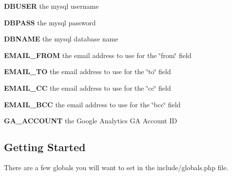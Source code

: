 \begin{DoxyItemize}
\item {\bfseries D\-B\-U\-S\-E\-R} the mysql username
\end{DoxyItemize}


\begin{DoxyItemize}
\item {\bfseries D\-B\-P\-A\-S\-S} the mysql password
\end{DoxyItemize}


\begin{DoxyItemize}
\item {\bfseries D\-B\-N\-A\-M\-E} the mysql database name
\end{DoxyItemize}


\begin{DoxyItemize}
\item {\bfseries E\-M\-A\-I\-L\-\_\-\-F\-R\-O\-M} the email address to use for the \char`\"{}from\char`\"{} field
\end{DoxyItemize}


\begin{DoxyItemize}
\item {\bfseries E\-M\-A\-I\-L\-\_\-\-T\-O} the email address to use for the \char`\"{}to\char`\"{} field
\end{DoxyItemize}


\begin{DoxyItemize}
\item {\bfseries E\-M\-A\-I\-L\-\_\-\-C\-C} the email address to use for the \char`\"{}cc\char`\"{} field
\end{DoxyItemize}


\begin{DoxyItemize}
\item {\bfseries E\-M\-A\-I\-L\-\_\-\-B\-C\-C} the email address to use for the \char`\"{}bcc\char`\"{} field
\end{DoxyItemize}


\begin{DoxyItemize}
\item {\bfseries G\-A\-\_\-\-A\-C\-C\-O\-U\-N\-T} the Google Analytics G\-A Account I\-D
\end{DoxyItemize}

\subsection*{Getting Started}

There are a few globals you will want to set in the include/globals.\-php file.


